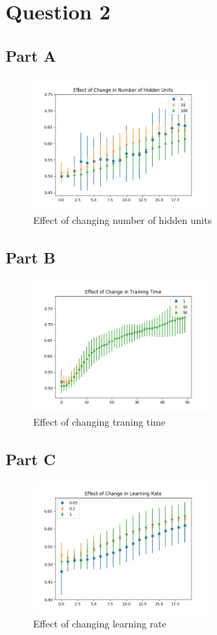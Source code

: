 \section{Question 2}
\subsection{Part A}
\begin{figure}[H]
	\centering
	\includegraphics[width=0.6\textwidth]{../train2/hidden_units.png}
	\caption{Effect of changing number of hidden units}
\end{figure}

\subsection{Part B}
\begin{figure}[H]
	\centering
	\includegraphics[width=0.6\textwidth]{../train2/epochs.png}
	\caption{Effect of changing traning time}
\end{figure}

\subsection{Part C}
\begin{figure}[H]
	\centering
	\includegraphics[width=0.6\textwidth]{../train2/learning_rate.png}
	\caption{Effect of changing learning rate}
\end{figure}

